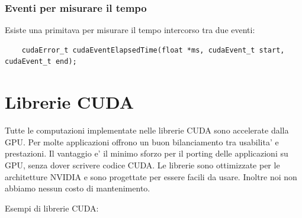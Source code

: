 \subsubsection{Eventi per misurare il tempo}
Esiste una primitava per misurare il tempo intercorso tra due eventi:
\begin{lstlisting}
    cudaError_t cudaEventElapsedTime(float *ms, cudaEvent_t start, cudaEvent_t end);
\end{lstlisting}

\section{Librerie CUDA}
Tutte le computazioni implementate nelle librerie CUDA sono accelerate dalla GPU. Per molte applicazioni offrono un buon bilanciamento tra usabilita' e prestazioni. Il vantaggio e' il minimo sforzo per il porting delle applicazioni su GPU, senza dover scrivere codice CUDA. Le librerie sono ottimizzate per le architetture NVIDIA e sono progettate per essere facili da usare. Inoltre noi non abbiamo nessun costo di mantenimento.

Esempi di librerie CUDA:
\begin{center}
\end{center}

